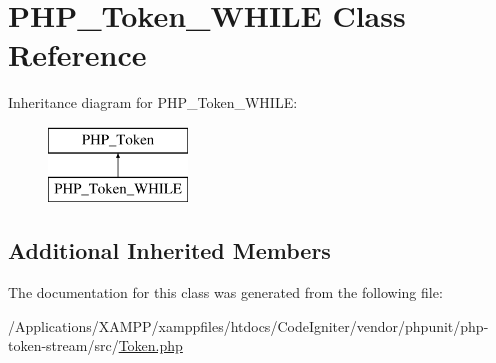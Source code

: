 \hypertarget{class_p_h_p___token___w_h_i_l_e}{}\section{P\+H\+P\+\_\+\+Token\+\_\+\+W\+H\+I\+LE Class Reference}
\label{class_p_h_p___token___w_h_i_l_e}
Inheritance diagram for P\+H\+P\+\_\+\+Token\+\_\+\+W\+H\+I\+LE\+:\begin{figure}[H]
\begin{center}
\leavevmode
\includegraphics[height=2.000000cm]{class_p_h_p___token___w_h_i_l_e}
\end{center}
\end{figure}
\subsection*{Additional Inherited Members}


The documentation for this class was generated from the following file\+:\begin{DoxyCompactItemize}
\item 
/\+Applications/\+X\+A\+M\+P\+P/xamppfiles/htdocs/\+Code\+Igniter/vendor/phpunit/php-\/token-\/stream/src/\mbox{\hyperlink{_token_8php}{Token.\+php}}\end{DoxyCompactItemize}

